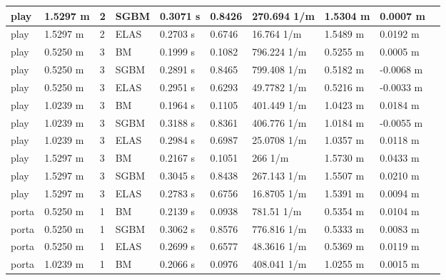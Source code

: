 \documentclass[11pt,a4paper,titlepage]{article}
\begin{document}
\begin{table}[!ht]
\begin{tabular}{@{}llllllllll@{}}
play & 1.5297 m & 2 & SGBM & 0.3071 s & 0.8426 & 270.694 1/m & 1.5304 m & 0.0007 m \\ \midrule
play & 1.5297 m & 2 & ELAS & 0.2703 s & 0.6746 & 16.764 1/m & 1.5489 m & 0.0192 m \\ \midrule
play & 0.5250 m & 3 & BM & 0.1999 s & 0.1082 & 796.224 1/m & 0.5255 m & 0.0005 m \\ \midrule
play & 0.5250 m & 3 & SGBM & 0.2891 s & 0.8465 & 799.408 1/m & 0.5182 m & -0.0068 m \\ \midrule
play & 0.5250 m & 3 & ELAS & 0.2951 s & 0.6293 & 49.7782 1/m & 0.5216 m & -0.0033 m \\ \midrule
play & 1.0239 m & 3 & BM & 0.1964 s & 0.1105 & 401.449 1/m & 1.0423 m & 0.0184 m \\ \midrule
play & 1.0239 m & 3 & SGBM & 0.3188 s & 0.8361 & 406.776 1/m & 1.0184 m & -0.0055 m \\ \midrule
play & 1.0239 m & 3 & ELAS & 0.2984 s & 0.6987 & 25.0708 1/m & 1.0357 m & 0.0118 m \\ \midrule
play & 1.5297 m & 3 & BM & 0.2167 s & 0.1051 & 266 1/m & 1.5730 m & 0.0433 m \\ \midrule
play & 1.5297 m & 3 & SGBM & 0.3045 s & 0.8438 & 267.143 1/m & 1.5507 m & 0.0210 m \\ \midrule
play & 1.5297 m & 3 & ELAS & 0.2783 s & 0.6756 & 16.8705 1/m & 1.5391 m & 0.0094 m \\ \midrule
porta & 0.5250 m & 1 & BM & 0.2139 s & 0.0938 & 781.51 1/m & 0.5354 m & 0.0104 m \\ \midrule
porta & 0.5250 m & 1 & SGBM & 0.3062 s & 0.8576 & 776.816 1/m & 0.5333 m & 0.0083 m \\ \midrule
porta & 0.5250 m & 1 & ELAS & 0.2699 s & 0.6577 & 48.3616 1/m & 0.5369 m & 0.0119 m \\ \midrule
porta & 1.0239 m & 1 & BM & 0.2066 s & 0.0976 & 408.041 1/m & 1.0255 m & 0.0015 m \\ \midrule
\end{tabular}
\end{table}
\end{document}
